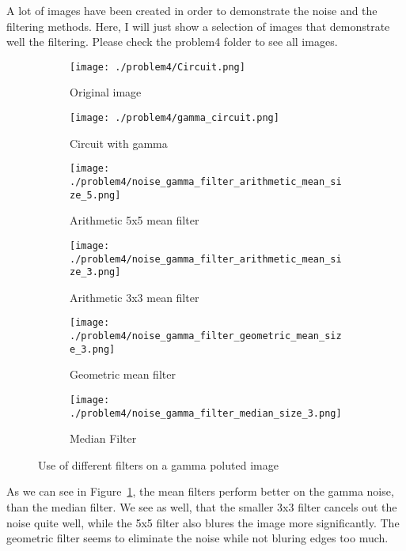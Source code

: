\documentclass[a4paper]{scrartcl}
\begin{document}
A lot of images have been created in order to demonstrate the noise and the filtering methods. Here, I will just show a selection of images that demonstrate well the filtering. Please check the problem4 folder to see all images.


\begin{figure}[h]
    \centering
    \begin{subfigure}[t]{0.4\textwidth}
      \texttt{[image: ./problem4/Circuit.png]}
        \caption{Original image}
    \end{subfigure}
    \begin{subfigure}[t]{0.4\textwidth}
      \texttt{[image: ./problem4/gamma\_circuit.png]}
        \caption{Circuit with gamma}
    \end{subfigure}
    \begin{subfigure}[t]{0.4\textwidth}
      \texttt{[image: ./problem4/noise\_gamma\_filter\_arithmetic\_mean\_size\_5.png]}
        \caption{Arithmetic 5x5 mean filter}
    \end{subfigure}
    \begin{subfigure}[t]{0.4\textwidth}
      \texttt{[image: ./problem4/noise\_gamma\_filter\_arithmetic\_mean\_size\_3.png]}
        \caption{Arithmetic 3x3 mean filter}
    \end{subfigure}
    \begin{subfigure}[t]{0.4\textwidth}
      \texttt{[image: ./problem4/noise\_gamma\_filter\_geometric\_mean\_size\_3.png]}
        \caption{Geometric mean filter}
    \end{subfigure}
    \begin{subfigure}[t]{0.4\textwidth}
      \texttt{[image: ./problem4/noise\_gamma\_filter\_median\_size\_3.png]}
        \caption{Median Filter}
    \end{subfigure}

    \caption{Use of different filters on a gamma poluted image}
    \label{fig:circuitgamma}
\end{figure}

As we can see in Figure~\ref{fig:circuitgamma}, the mean filters perform better on the gamma noise, than the median filter. We see as well, that the smaller 3x3 filter cancels out the noise quite well, while the 5x5 filter also blures the image more significantly. The geometric filter seems to eliminate the noise while not bluring edges too much.
\end{document}

